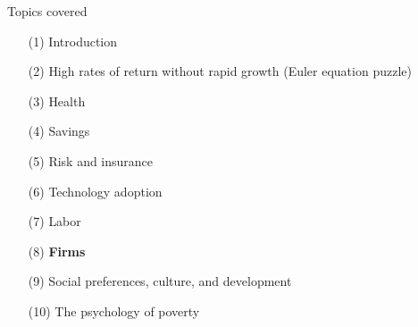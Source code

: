 \documentclass[aspectratio=169, 10pt, handout]{beamer}
\begin{document}
\begin{frame}{Topics covered}

\small 

\begin{enumerate}[(1)]

	\item[(1)] Introduction 
	
	\item[(2)] {High rates of return without rapid growth (Euler equation puzzle)}

	\item[(3)] {Health}
	
	\item[(4)] {Savings}
		
	\item[(5)] {Risk and insurance}

	\item[(6)] {Technology adoption}
	
	\item[(7)] {Labor}

	\item[(8)] \textbf{Firms}
	
	\item[(9)] Social preferences, culture, and development
	
	\item[(10)] The psychology of poverty

\end{enumerate}

\end{frame}
\end{document}
